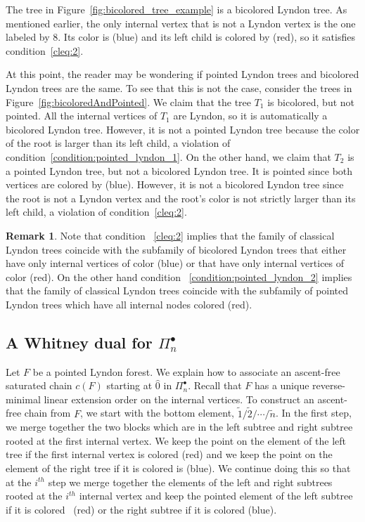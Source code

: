 \documentclass[11pt]{article}
\theoremstyle{definition}
\newtheorem{rema}[theo]{Remark}
\numberwithin{equation}{section}
\newcommand{\tre}[1]{{\color{red}{#1}}}
\newcommand{\tbl}[1]{{\color{blue}{#1}}}
\begin{document}
The tree in Figure~\ref{fig:bicolored_tree_example} is a bicolored Lyndon tree.  As mentioned earlier, the only internal vertex that is not a Lyndon vertex is the one labeled by 8.   Its color is \tbl{0} (blue) and its left child is colored by \tre{1} (red), so it satisfies condition~\eqref{cleq:2}.  

At this point, the reader may be wondering if pointed Lyndon trees and bicolored Lyndon trees are the same.  To see that this is not the case, consider the trees in Figure~\ref{fig:bicoloredAndPointed}.  We claim that the tree $T_1$ is bicolored, but not pointed.  All the internal vertices of $T_1$ are Lyndon, so it is automatically a bicolored Lyndon tree.  However,  it is not a pointed Lyndon tree because the color of the root is larger than its left child, a violation of condition~\eqref{condition:pointed_lyndon_1}.  On the other hand, we claim that $T_2$ is a pointed Lyndon tree, but not a bicolored Lyndon tree.  It is pointed  since both vertices are colored by \tbl{0} (blue).   However, it is not a bicolored Lyndon tree since the root is not a Lyndon vertex and the root's color is not strictly larger than its left child, a violation of condition~\eqref{cleq:2}.

\begin{rema} Note that condition ~\eqref{cleq:2} implies that the family of  classical Lyndon trees coincide with the subfamily of bicolored Lyndon trees that either have only internal vertices of color \tbl{0} (blue) or that have only internal vertices of color \tre{1} (red).  On the other hand condition ~\eqref{condition:pointed_lyndon_2} implies that the family of classical Lyndon trees coincide with the subfamily of pointed Lyndon trees which have all internal nodes colored \tre{1} (red).
\end{rema}

\subsection{A Whitney dual for \texorpdfstring{$\Pi_n^\bullet$}-} \label{subsection:whitney_dual_pointed}

 Let $F$ be a pointed Lyndon forest.  We explain how to associate an ascent-free saturated chain $c(F)$ starting at $\hat{0}$ in $\Pi_n^\bullet$.  Recall that $F$ has a unique reverse-minimal linear extension order on the internal vertices.  To construct an ascent-free chain from $F$, we start with the   bottom element, $\tilde{1}/\tilde{2}/\cdots /\tilde{n}$.  In the first step, we merge together the two blocks which are  in the left subtree and right subtree rooted at the first internal vertex.   We keep the point on the element of the left tree if the first internal vertex is colored \tre{1} (red) and we keep the point on the element of the right tree if it is  colored is \tbl{0} (blue).   We continue doing this so that at the $i^{th}$ step we merge together the elements of the left and right subtrees rooted at the $i^{th}$ internal vertex and keep the pointed element of the left subtree if it is colored~\tre{1} (red) or the right subtree if it is colored \tbl{0} (blue). 
\end{document}
